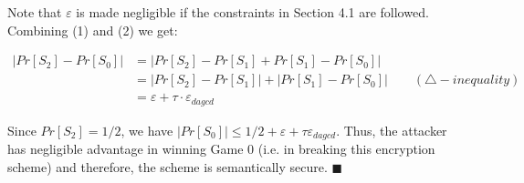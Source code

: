 \documentclass[../../main.tex]{subfiles}
\begin{document}
\noindent Note that $\varepsilon$ is made negligible if the constraints in Section 4.1 are followed. Combining (1) and (2) we get:

\begin{equation*}
    \begin{split}
        |Pr[S_2]-Pr[S_0]| &= |Pr[S_2]-Pr[S_1]+Pr[S_1]-Pr[S_0]| \\
                          &= |Pr[S_2]-Pr[S_1]| + |Pr[S_1]-Pr[S_0]| \qquad (\triangle-inequality) \\
                          &= \varepsilon + \tau \cdot \varepsilon_{dagcd}
    \end{split}
\end{equation*}

\noindent Since $Pr[S_2] = 1/2$, we have $|Pr[S_0]| \leq 1/2 + \varepsilon + \tau \varepsilon_{dagcd}$. Thus, the attacker has negligible advantage in winning Game 0 (i.e. in breaking this encryption scheme) and therefore, the scheme is semantically secure. $\blacksquare$
\end{document}
